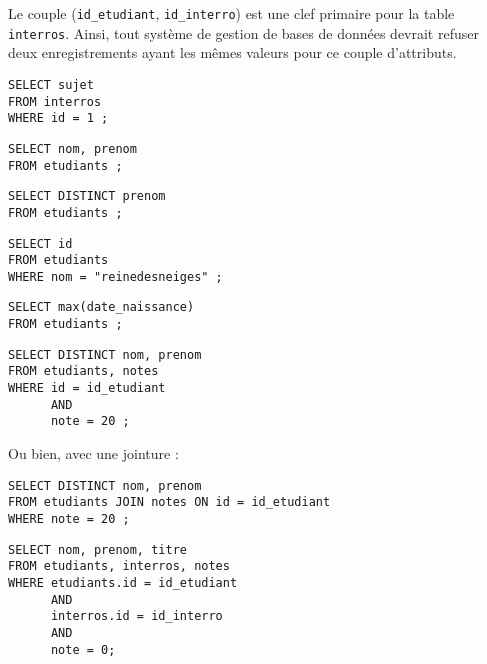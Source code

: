 \question{} Le couple (\texttt{id\_etudiant}, \texttt{id\_interro}) est une clef primaire pour la table \texttt{interros}. 
  Ainsi, tout système de gestion de bases de données devrait refuser deux enregistrements ayant les mêmes valeurs pour ce couple d'attributs. 
  
  
\medskip{}  
  
\question{}
\begin{verbatim}
SELECT sujet
FROM interros
WHERE id = 1 ;
\end{verbatim}

  
\medskip{}  
  
\question{}
\begin{verbatim}
SELECT nom, prenom
FROM etudiants ;
\end{verbatim}
  
\medskip{}  
  
\question{}
\begin{verbatim}
SELECT DISTINCT prenom
FROM etudiants ;
\end{verbatim}
  
\medskip{}  
  
\question{}
\begin{verbatim}
SELECT id
FROM etudiants
WHERE nom = "reinedesneiges" ;
\end{verbatim}
  
\medskip{}  
  
\question{}
\begin{verbatim}
SELECT max(date_naissance)
FROM etudiants ;
\end{verbatim}
  
\medskip{}  
  
\question{}
\begin{verbatim}
SELECT DISTINCT nom, prenom
FROM etudiants, notes 
WHERE id = id_etudiant
      AND
      note = 20 ;
\end{verbatim}
Ou bien, avec une jointure : 
\begin{verbatim}
SELECT DISTINCT nom, prenom
FROM etudiants JOIN notes ON id = id_etudiant
WHERE note = 20 ;
\end{verbatim}

\medskip{}  
  
\question{}

\begin{verbatim}
SELECT nom, prenom, titre
FROM etudiants, interros, notes
WHERE etudiants.id = id_etudiant
      AND
      interros.id = id_interro
      AND 
      note = 0;
\end{verbatim}

